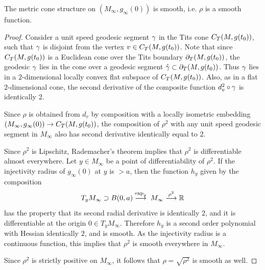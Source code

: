 \begin{lemma}
  \label{lem:kl-asymptotic-scalar-curvature-asymptotic-volume-ratio-scalar-curvature-lemma}

The metric cone structure on $(M_\infty,g_\infty(0))$  is
smooth, i.e. $\rho$ is a smooth function.
\end{lemma}
\begin{proof}
Consider a unit speed geodesic segment $\gamma$ in the Tits cone
$C_T(M,g(t_0))$,
such that $\gamma$ is disjoint from the vertex $v\in C_T(M,g(t_0))$.
Note that since $C_T(M,g(t_0))$ is a Euclidean cone over
the Tits boundary $\partial_T (M,g(t_0))$, the
geodesic $\gamma$ lies in the cone over a geodesic segment
$\hat{\gamma}\subset\partial_T (M,g(t_0))$.
Thus $\gamma$ lies in a
$2$-dimensional
locally convex flat subspace of $C_T(M,g(t_0))$.
Also, as in a flat $2$-dimensional cone,
the second derivative of the composite function
$d_v^2\circ\gamma$ is identically $2$.

Since $\rho$ is obtained from $d_v$ by composition with a locally isometric
embedding $(M_\infty,g_\infty(0))\rightarrow C_T(M,g(t_0))$, the composition
of $\rho^2$ with any unit speed geodesic segment in $M_\infty$
also has second derivative identically equal to $2$.


Since $\rho^2$ is Lipschitz, Rademacher's theorem implies that $\rho^2$
is differentiable almost everywhere.
Let $y\in M_\infty$ be a point of differentiability of $\rho^2$.
 If the injectivity radius of $g_\infty(0)$ at
$y$ is $>a$, then the function $h_y$ given by  the composition
$$
T_yM_\infty\supset B(0,a)\stackrel{\exp_y}{\longrightarrow}\;M_\infty
\stackrel{\rho^2}{\longrightarrow}{\mathbb R}
$$
has the property that its second radial derivative is identically $2$,
and it is differentiable at the origin $0\in T_yM_\infty$.
Therefore
$h_y$ is a second order polynomial with Hessian identically $2$,
and is smooth.  As the injectivity radius is a continuous function, this
implies that $\rho^2$ is smooth everywhere in $M_\infty$.

Since $\rho^2$ is strictly positive on $M_\infty$,
it follows that $\rho=\sqrt{\rho^2}$
is smooth as well.
\end{proof}

